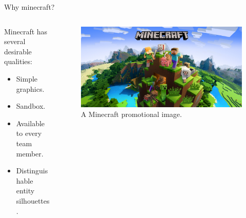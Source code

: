 \documentclass[english]{beamer}
\begin{document}
\begin{frame}{Why minecraft?}

  \begin{columns}
    
    \begin{column}{0.5\textwidth}
      Minecraft has several desirable qualities:
      \begin{itemize}
        \item Simple graphics.
        \item Sandbox.
        \item Available to every team member.
        \item Distinguishable entity silhouettes.
      \end{itemize}
    \end{column}

    \begin{column}{0.5\textwidth}
      \begin{figure}
        \centering
            \includegraphics[width=1.0\textwidth]{images/minecraft.jpg}
            \caption{A Minecraft promotional image.}
        \end{figure}
    \end{column}

  \end{columns}

\end{frame}
\end{document}
